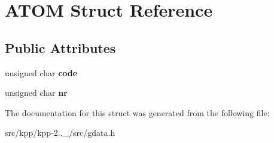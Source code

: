 \hypertarget{structATOM}{}\section{A\+T\+OM Struct Reference}
\label{structATOM}
\subsection*{Public Attributes}
\begin{DoxyCompactItemize}
\item 
\mbox{\label{structATOM_a74cf8c7a665dfb6a2775f0d3999d94eb}} 
unsigned char {\bfseries code}
\item 
\mbox{\label{structATOM_aae61a7071506ad38e04655870abcb697}} 
unsigned char {\bfseries nr}
\end{DoxyCompactItemize}


The documentation for this struct was generated from the following file\+:\begin{DoxyCompactItemize}
\item 
src/kpp/kpp-\/2..\+\_/src/gdata.\+h\end{DoxyCompactItemize}
